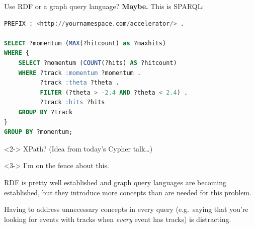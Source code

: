 \documentclass{beamer}
\begin{document}
\begin{frame}[fragile]{Use RDF or a graph query language?}
\vspace{0.25 cm}
{\bf Maybe.} This is SPARQL:

\begin{lstlisting}[language=sql]
PREFIX : <http://yournamespace.com/accelerator/> .

SELECT ?momentum (MAX(?hitcount) as ?maxhits)
WHERE {
    SELECT ?momentum (COUNT(?hits) AS ?hitcount)
    WHERE ?track :momentum ?momentum .
          ?track :theta ?theta .
          FILTER (?theta > -2.4 AND ?theta < 2.4) .
          ?track :hits ?hits
    GROUP BY ?track
}
GROUP BY ?momentum;
\end{lstlisting}

\vspace{0.25 cm}
\begin{uncoverenv}<2->
XPath? (Idea from today's Cypher talk\ldots)
\end{uncoverenv}

\vspace{0.25 cm}
\begin{uncoverenv}<3->
I'm on the fence about this.

\vspace{0.25 cm}
\begin{minipage}{\linewidth}
\scriptsize
RDF is pretty well established and graph query languages are becoming established, but they introduce more concepts than are needed for this problem.

\vspace{0.25 cm}
Having to address unnecessary concepts in every query (e.g.\ saying that you're looking for events with tracks when {\it every} event has tracks) is distracting.
\end{minipage}
\end{uncoverenv}
\end{frame}
\end{document}
